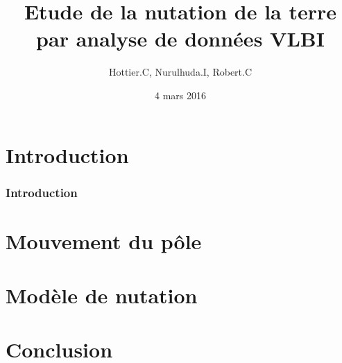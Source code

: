 \documentclass[french]{beamer}
\title[Soutenance MT3]{Etude de la nutation de la terre par analyse de données VLBI}
\author{Hottier.C, Nurulhuda.I, Robert.C}
\date{4 mars 2016}
\newcommand{\frtt}[1]{\frametitle{#1}}
\begin{document}
\begin{frame}
  \maketitle
\end{frame}

\begin{frame}
  \tableofcontents
\end{frame}
\section{Introduction}

\begin{frame}
  \frtt{Introduction}
\end{frame}


\section{Mouvement du pôle}

\section{Modèle de nutation}

\section{Conclusion}
\end{document}
